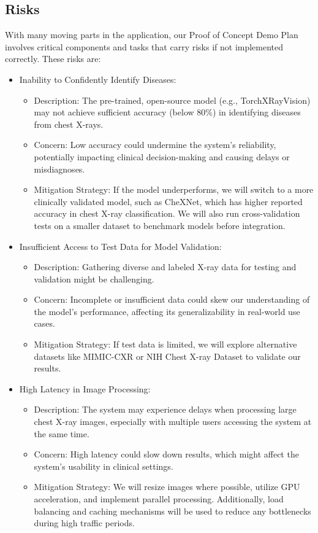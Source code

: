 \documentclass{article}
\begin{document}
\subsection{Risks}
With many moving parts in the application, our Proof of Concept Demo Plan involves critical components and tasks that carry risks if not implemented correctly. These risks are:

\begin{itemize}
    \item Inability to Confidently Identify Diseases:
    \begin{itemize}
        \item Description: The pre-trained, open-source model (e.g., TorchXRayVision) may not achieve sufficient accuracy (below 80\%) in identifying diseases from chest X-rays.
        \item Concern: Low accuracy could undermine the system's reliability, potentially impacting clinical decision-making and causing delays or misdiagnoses.
        \item Mitigation Strategy: If the model underperforms, we will switch to a more clinically validated model, such as CheXNet, which has higher reported accuracy in chest X-ray classification. We will also run cross-validation tests on a smaller dataset to benchmark models before integration.
    \end{itemize}

    \item Insufficient Access to Test Data for Model Validation:
    \begin{itemize}
        \item Description: Gathering diverse and labeled X-ray data for testing and validation might be challenging.
        \item Concern: Incomplete or insufficient data could skew our understanding of the model’s performance, affecting its generalizability in real-world use cases.
        \item Mitigation Strategy: If test data is limited, we will explore alternative datasets like MIMIC-CXR or NIH Chest X-ray Dataset to validate our results.
    \end{itemize}

    \item High Latency in Image Processing:
    \begin{itemize}
        \item Description: The system may experience delays when processing large chest X-ray images, especially with multiple users accessing the system at the same time.
        \item Concern: High latency could slow down results, which might affect the system’s usability in clinical settings.
        \item Mitigation Strategy: We will resize images where possible, utilize GPU acceleration, and implement parallel processing. Additionally, load balancing and caching mechanisms will be used to reduce any bottlenecks during high traffic periods.
    \end{itemize}


\end{itemize}
\end{document}
